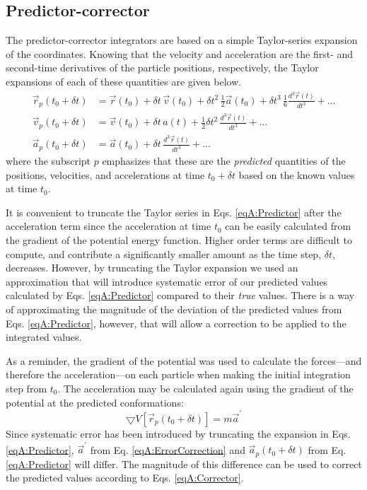 \subsection{Predictor-corrector}

The predictor-corrector integrators are based on a simple Taylor-series
expansion of the coordinates. Knowing that the velocity and acceleration are the
first- and second-time derivatives of the particle positions, respectively, the
Taylor expansions of each of these quantities are given below.
\begin{align}
   \vec{r}_p (t_0 + \delta t) & = \vec{r}(t_0) + \delta t \, \vec{v}(t_0) +
         \delta t^2 \, \frac 1 2 \vec{a}(t_0) + \delta t^3 \, \frac 1 6 \frac
         {d^3\vec{r}(t)} {dt^3} + ... \nonumber \\
   \vec{v}_p (t_0 + \delta t) & = \vec{v}(t_0) + \delta t \, a(t) + \frac 1 2 
         \delta t^2 \, \frac {d^3\vec{r}(t)} {dt^3} + ...
   \label{eqA:Predictor} \\
   \vec{a}_p (t_0 + \delta t) & = \vec{a}(t_0) + \delta t \, \frac
         {d^3\vec{r}(t)} {dt^3} + ... \nonumber
\end{align}
where the subscript $p$ emphasizes that these are the \emph{predicted}
quantities of the positions, velocities, and accelerations at time $t_0 + \delta
t$ based on the known values at time $t_0$.

It is convenient to truncate the Taylor series in Eqs. \ref{eqA:Predictor} after
the acceleration term since the acceleration at time $t_0$ can be easily
calculated from the gradient of the potential energy function. Higher order
terms are difficult to compute, and contribute a significantly smaller amount as
the time step, $\delta t$, decreases. However, by truncating the Taylor
expansion we used an approximation that will introduce systematic error of our
predicted values calculated by Eqs. \ref{eqA:Predictor} compared to their
\emph{true} values. There is a way of approximating the magnitude of the
deviation of the predicted values from Eqs. \ref{eqA:Predictor}, however, that
will allow a correction to be applied to the integrated values.

As a reminder, the gradient of the potential was used to calculate the
forces---and therefore the acceleration---on each particle when making the
initial integration step from $t_0$. The acceleration may be calculated again
using the gradient of the potential at the predicted conformations:
\begin{equation}
   \bigtriangledown V\left[\vec{r}_p(t_0 + \delta t)\right] = m \vec{a}^{\prime}
   \label{eqA:ErrorCorrection}
\end{equation}
Since systematic error has been introduced by truncating the expansion in Eqs.
\ref{eqA:Predictor}, $\vec{a}^{\prime}$ from Eq. \ref{eqA:ErrorCorrection} and
$\vec{a}_p(t_0 + \delta t)$ from Eq. \ref{eqA:Predictor} will differ. The
magnitude of this difference can be used to correct the predicted values
according to Eqs. \ref{eqA:Corrector}.

